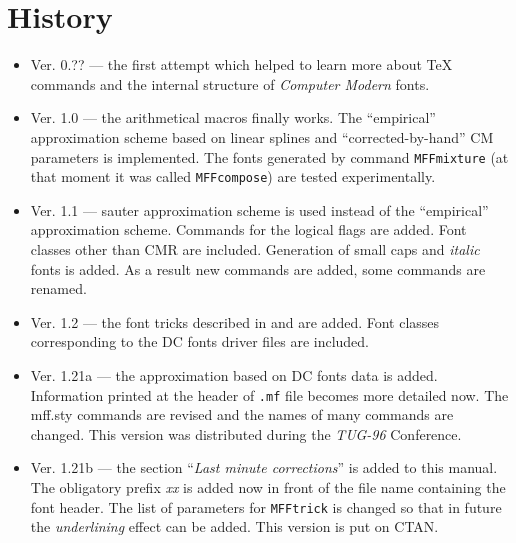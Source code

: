 \section{History}
\begin{itemize}
\item Ver. 0.??  --- the first attempt which helped
                     to learn more about \TeX{} commands and
                     the internal structure of
                     {\sl Computer Modern} fonts.
\item Ver. 1.0 --- the arithmetical macros finally works.
                   The ``empirical'' approximation scheme based
                   on linear splines and ``corrected-by-hand''
                   CM parameters is implemented.
                   The fonts generated by command
                   {\tt\bs{}MFFmixture} (at that moment it was called
                   {\tt\bs{}MFFcompose}) are tested experimentally.
\item Ver. 1.1 --- {\sc sauter} approximation scheme is used instead
                   of the ``empirical'' approximation scheme.
                   Commands for the logical flags are added.
                   Font classes other than CMR are included.
                   Generation of {\sc small caps} and
                   {\it italic} fonts is added.
                   As a result new commands are added,
                   some commands are renamed.
\item Ver. 1.2 --- the font tricks described in \cite{ABC} and \cite{Outline}
                   are added.
                   Font classes corresponding to the {\sc DC fonts}
                   driver files are included.
\item Ver. 1.21a --- the approximation based on {\sc DC fonts} data is added.
                   Information printed at the header of {\tt .mf} file
                   becomes more detailed now.
                   The {\sc mff.sty} commands are revised
                   and the names of many commands are changed.
                   This version was distributed during the {\sl TUG-96}
                   Conference.
\item Ver. 1.21b --- the section ``{\em Last minute corrections}''
                   is added to this manual. The obligatory prefix
                   {\em xx} is added now in front of the file name
                   containing the font header. The list of parameters
                   for {\tt\bs{}MFFtrick} is changed so that in future
                   the {\em underlining} effect can be added.
                   This version is put on CTAN.
\end{itemize}

